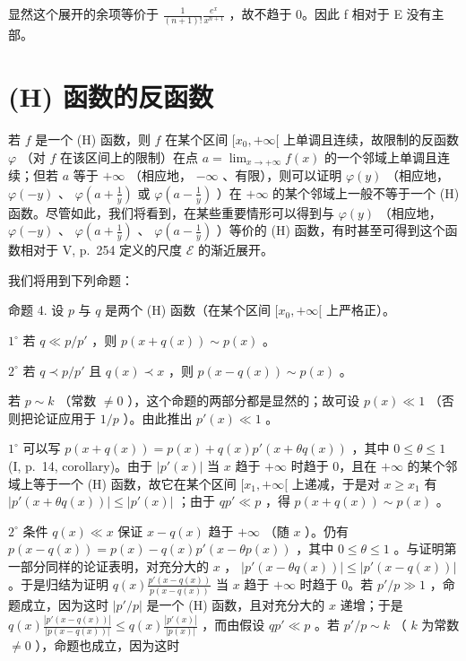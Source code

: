 显然这个展开的余项等价于 \(\frac{1}{(n+1)!}\frac{e^{x}}{x^{n+1}}\) ，故不趋于 0。因此 f 相对于 E 没有主部。

\section{(H) 函数的反函数}

若 \(f\) 是一个 (H) 函数，则 \(f\) 在某个区间 \([x_0, +\infty[\) 上单调且连续，故限制的反函数 \(\varphi\) （对 \(f\) 在该区间上的限制）在点 \(a = \lim_{x \to +\infty} f(x)\) 的一个邻域上单调且连续；但若 \(a\) 等于 \(+\infty\) （相应地， \(-\infty\) 、有限），则可以证明 \(\varphi(y)\) （相应地， \(\varphi(-y)\) 、 \(\varphi(a + \frac{1}{y})\) 或 \(\varphi(a - \frac{1}{y})\) ）在 \(+\infty\) 的某个邻域上一般不等于一个 (H) 函数。尽管如此，我们将看到，在某些重要情形可以得到与 \(\varphi(y)\) （相应地， \(\varphi(-y)\) 、 \(\varphi(a + \frac{1}{y})\) 、 \(\varphi(a - \frac{1}{y})\) ）等价的 (H) 函数，有时甚至可得到这个函数相对于 V, p.~254 定义的尺度 \(\mathcal{E}\) 的渐近展开。

我们将用到下列命题：

命题 4. 设 \(p\) 与 \(q\) 是两个 (H) 函数（在某个区间 \([x_0, +\infty[\) 上严格正）。

\(1^{\circ}\) 若 \(q \ll p / p'\) ，则 \(p(x + q(x)) \sim p(x)\) 。

\(2^{\circ}\) 若 \(q \prec p/p'\) 且 \(q(x) \prec x\) ，则 \(p(x - q(x)) \sim p(x)\) 。

若 \(p \sim k\) （常数 \(\neq 0\) ），这个命题的两部分都是显然的；故可设 \(p(x) \ll 1\) （否则把论证应用于 \(1/p\) ）。由此推出 \(p'(x) \ll 1\) 。

\(1^{\circ}\) 可以写 \(p(x + q(x)) = p(x) + q(x)p'(x + \theta q(x))\) ，其中 \(0 \leqslant \theta \leqslant 1\) (I, p.~14, corollary)。由于 \(\left|p'(x)\right|\) 当 \(x\) 趋于 \(+\infty\) 时趋于 0，且在 \(+\infty\) 的某个邻域上等于一个 (H) 函数，故它在某个区间 \([x_1, +\infty[\) 上递减，于是对 \(x \geqslant x_1\) 有 \(\left|p'(x + \theta q(x))\right| \leqslant \left|p'(x)\right|\) ；由于 \(qp' \ll p\) ，得 \(p(x + q(x)) \sim p(x)\) 。

\(2^{\circ}\) 条件 \(q(x) \ll x\) 保证 \(x - q(x)\) 趋于 \(+\infty\) （随 \(x\) ）。仍有 \(p(x - q(x)) = p(x) - q(x)p'(x - \theta p(x))\) ，其中 \(0 \leqslant \theta \leqslant 1\) 。与证明第一部分同样的论证表明，对充分大的 \(x\) ， \(\left|p'(x - \theta q(x))\right| \leqslant \left|p'(x - q(x))\right|\) 。于是归结为证明 \(q(x)\frac{p'(x - q(x))}{p(x - q(x))}\) 当 \(x\) 趋于 \(+\infty\) 时趋于 0。若 \(p'/p \gg 1\) ，命题成立，因为这时 \(\left|p'/p\right|\) 是一个 (H) 函数，且对充分大的 \(x\) 递增；于是 \(q(x)\frac{\left|p'(x - q(x))\right|}{\left|p(x - q(x))\right|} \leqslant q(x)\frac{\left|p'(x)\right|}{\left|p(x)\right|}\) ，而由假设 \(qp' \ll p\) 。若 \(p'/p \sim k\) （ \(k\) 为常数 \(\neq 0\) ），命题也成立，因为这时

